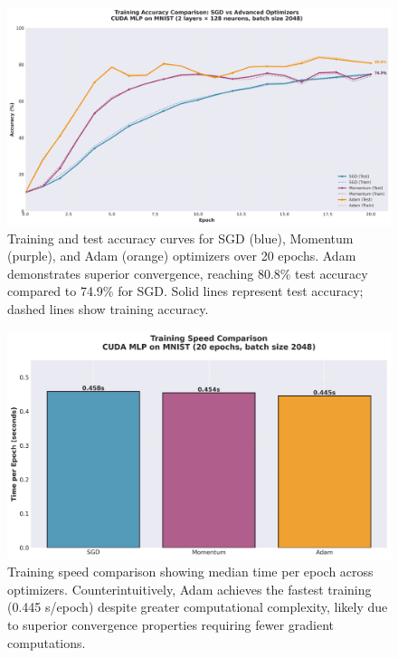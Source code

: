\documentclass[conference]{IEEEtran}
\begin{document}
\begin{figure}[htbp]
\centerline{\includegraphics[width=\columnwidth]{training_accuracy_comparison.png}}
\caption{Training and test accuracy curves for SGD (blue), Momentum (purple), and Adam (orange) optimizers over 20 epochs. Adam demonstrates superior convergence, reaching 80.8\% test accuracy compared to 74.9\% for SGD. Solid lines represent test accuracy; dashed lines show training accuracy.}
\label{fig:accuracy}
\end{figure}

\begin{figure}[htbp]
\centerline{\includegraphics[width=0.85\columnwidth]{training_time_comparison.png}}
\caption{Training speed comparison showing median time per epoch across optimizers. Counterintuitively, Adam achieves the fastest training (0.445 s/epoch) despite greater computational complexity, likely due to superior convergence properties requiring fewer gradient computations.}
\label{fig:speed}
\end{figure}
\end{document}
